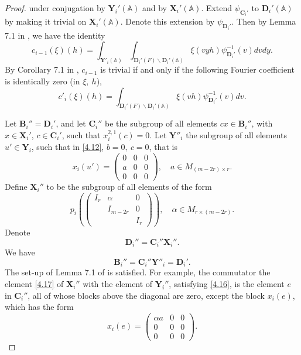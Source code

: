 \documentclass[12pts]{amsart}
\newcommand{\BA}{{\mathbb {A}}}
\begin{document}
\begin{proof}
	under conjugation by $\mathbf{Y}_i'(\BA)$ and by
	$\mathbf{X}_i'(\BA)$. Extend $\psi_{\mathbf{C}_i'}$ to
	$\mathbf{D}_i'(\BA)$ by making it trivial on $\mathbf{X}_i'(\BA)$. Denote this extension by $\psi_{\mathbf{D}_i'}$. Then by Lemma
	7.1 in \cite{GRS11}, we have the identity
	\begin{equation}\label{4.15}
	c_{i-1}(\xi)(h)=\int_{\mathbf{Y}'_i(\BA)}\int_{\mathbf{D}_i'(F)\backslash \mathbf{D}_i'(\BA)}\xi(vyh)\psi_{\mathbf{D}_i'}^{-1}(v)dvdy.
	\end{equation}
	By Corollary 7.1 in \cite{GRS11}, $c_{i-1}$ is trivial if and only
	if the following Fourier coefficient is identically zero (in $\xi,\
	h$),
	$$
	c'_i(\xi)(h)=\int_{\mathbf{D}_i'(F)\backslash \mathbf{D}_i'(\BA)}\xi(vh)\psi_{\mathbf{D}_i'}^{-1}(v)dv.
	$$
		
	Let $ \mathbf{B}_i''=\mathbf{D}_i'$, and let $ \mathbf{C}_i''$ be the
	subgroup of all elements $cx\in \mathbf{B}_i''$, with $x\in
	\mathbf{X}_i'$, $c\in \mathbf{C}_i'$, such that $x_i^{2,1}(c)=0$. Let
	$\mathbf{Y}''_i$ the subgroup of all elements $u'\in \mathbf{Y}_i$,
	such that in \eqref{4.12}, $b=0,\ c=0$, that is
	\begin{equation}\label{4.16}
	x_i(u')=\begin{pmatrix}0&0&0\\a&0&0\\0&0&0\end{pmatrix},\quad a\in
	M_{(m-2r)\times r}.
	\end{equation}
	Define $\mathbf{X}_i''$ to be the subgroup of all elements of the form
	\begin{equation}\label{4.17}
	p_i(\begin{pmatrix}I_r&\alpha&0\\&I_{m-2r}&0\\&&I_r\end{pmatrix}),\quad \alpha\in
	M_{r\times(m-2r)}.
	\end{equation}
	Denote 
	$$
	\mathbf{D}_i''=\mathbf{C}_i''\mathbf{X}_i''.
	$$
	We have
	$$
	\mathbf{B}_i''=\mathbf{C}_i''\mathbf{Y}''_i=\mathbf{D}_i'.
	$$
	The set-up of Lemma 7.1 of \cite{GRS11} is satisfied. For example,
	the commutator the element \eqref{4.17} of $\mathbf{X}_i''$ with the
	element of  $\mathbf{Y}_i''$, satisfying \eqref{4.16}, is the element
	$e$ in $\mathbf{C}_i''$, all of whose blocks above the diagonal are
	zero, except the block $x_i(e)$, which has the form
	$$
	x_i(e)=\begin{pmatrix}\alpha a&0&0\\0&0&0\\0&0&0\end{pmatrix}.
$$
\end{proof}
\end{document}
